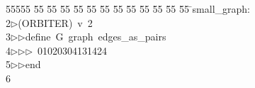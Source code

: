 %
%
\begin{tabbing}
55555 \= 55 \= 55 \= 55 \= 55 \= 55 \= 55 \= 55 \= 55 \= 55 \= 55 \= 55 \= 55 \= \>small\_graph:\\[0pt]
2\>$\triangleright$\>(ORBITER)\ v\ 2\ \\[0pt]
3\>$\triangleright$\>$\triangleright$\>define\ G\ graph\ edges\_as\_pairs\ \\[0pt]
4\>$\triangleright$\>$\triangleright$\>$\triangleright$\ 01020304131424\ \\[0pt]
5\>$\triangleright$\>$\triangleright$\>end\\[0pt]
6\>\end{tabbing}
